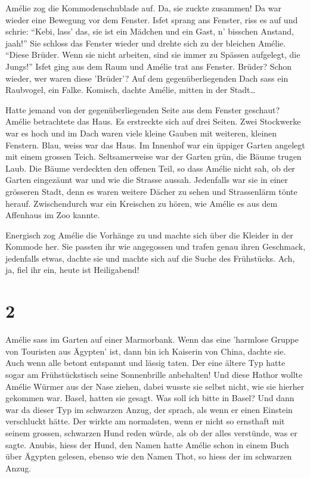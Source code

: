 \documentclass[11pt,titlepage,a5paper]{book}
\begin{document}
Amélie zog die Kommodenschublade auf. Da, sie zuckte zusammen! Da war wieder eine Bewegung vor dem Fenster. Isfet sprang ans Fenster, riss es auf und schrie: "`Kebi, lass' das, sie ist ein Mädchen und ein Gast, n' bisschen Anstand, jaah!"' Sie schloss das Fenster wieder und drehte sich zu der bleichen Amélie. "`Diese Brüder. Wenn sie nicht arbeiten, sind sie immer zu Spässen aufgelegt, die Jungs!"' Isfet ging aus dem Raum und Amélie trat ans Fenster. Brüder? Schon wieder, wer waren diese 'Brüder'? Auf dem gegenüberliegenden Dach sass ein Raubvogel, ein Falke. Komisch, dachte Amélie, mitten in der Stadt\dots

Hatte jemand von der gegenüberliegenden Seite aus dem Fenster geschaut? Amélie betrachtete das Haus. Es erstreckte sich auf drei Seiten. Zwei Stockwerke war es hoch und im Dach waren viele kleine Gauben mit weiteren, kleinen Fenstern. Blau, weiss war das Haus. Im Innenhof war ein üppiger Garten angelegt mit einem grossen Teich. Seltsamerweise war der Garten grün, die Bäume trugen Laub. Die Bäume verdeckten den offenen Teil, so dass Amélie nicht sah, ob der Garten eingezäunt war und wie die Strasse aussah. Jedenfalls war sie in einer grösseren Stadt, denn es waren weitere Dächer zu sehen und Strassenlärm tönte herauf. Zwischendurch war ein Kreischen zu hören, wie Amélie es aus dem Affenhaus im Zoo kannte.
 
 Energisch zog Amélie die Vorhänge zu und machte sich über die Kleider in der Kommode her. Sie passten ihr wie angegossen und trafen genau ihren Geschmack, jedenfalls etwas, dachte sie und machte sich auf die Suche des Frühstücks. Ach, ja, fiel ihr ein, heute ist Heiligabend!


\section*{2}


Amélie sass im Garten auf einer Marmorbank. Wenn das eine 'harmlose Gruppe von Touristen aus Ägypten' ist, dann bin ich Kaiserin von China, dachte sie. Auch wenn alle betont entspannt und lässig taten. Der eine ältere Typ hatte sogar am Frühstückstisch seine Sonnenbrille anbehalten! Und diese Hathor wollte Amélie Würmer aus der Nase ziehen, dabei wusste sie selbst nicht, wie sie hierher gekommen war. Basel, hatten sie gesagt. Was soll ich bitte in Basel? Und dann war da dieser Typ im schwarzen Anzug, der sprach, als wenn er einen Einstein verschluckt hätte. Der wirkte am normalsten, wenn er nicht so ernsthaft mit seinem grossen, schwarzen Hund reden würde, als ob der alles verstünde, was er sagte. Anubis, hiess der Hund, den Namen hatte Amélie schon in einem Buch über Ägypten gelesen, ebenso wie den Namen Thot, so hiess der im schwarzen Anzug.
\end{document}
